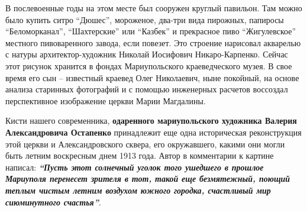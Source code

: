 В послевоенные годы на этом месте был сооружен круглый павильон. Там можно было
купить ситро \enquote{Дюшес}, мороженое, два-три вида пирожных, папиросы
\enquote{Беломорканал}, \enquote{Шахтерские} или \enquote{Казбек} и прекрасное пиво \enquote{Жигулевское}
местного пивоваренного завода, если повезет. Это строение нарисовал акварелью с
натуры архитектор-художник Николай Иосифович Никаро-Карпенко. Сейчас этот
рисунок хранится в фондах Мариупольского краеведческого музея. В свое время его
сын – известный краевед Олег Николаевич, ныне покойный, на основе анализа
старинных фотографий и с помощью инженерных расчетов воссоздал перспективное
изображение церкви Марии Магдалины.

Кисти нашего современника, \textbf{одаренного мариупольского художника Валерия
Александровича Остапенко} принадлежит еще одна историческая реконструкция этой
церкви и Александровского сквера, его окружавшего, какими они могли быть летним
воскресным днем 1913 года. Автор в комментарии к картине написал: \textbf{\em\enquote{Пусть этот
солнечный уголок того ушедшего в прошлое Мариуполя перенесет зрителя в тот,
такой еще безмятежный, поющий теплым чистым летним воздухом южного городка,
счастливый мир сиюминутного счастья}}.

